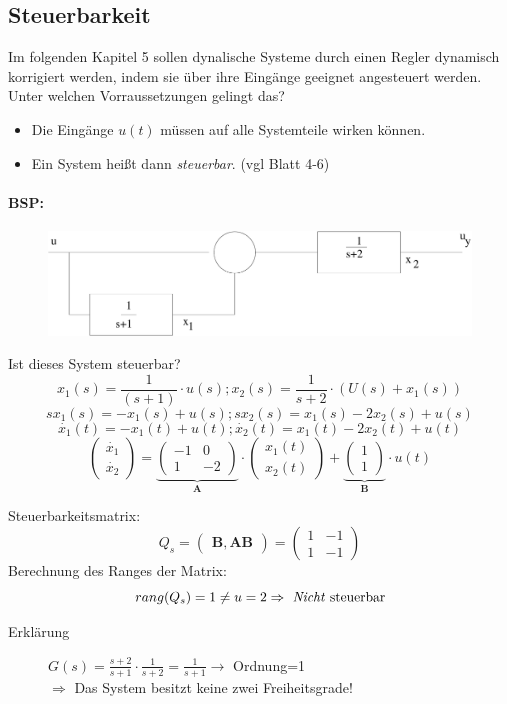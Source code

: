 \documentclass[12pt,a4paper,ngerman]{scrartcl}
\begin{document}
\subsection{Steuerbarkeit}

Im folgenden Kapitel 5 sollen dynalische Systeme durch einen Regler dynamisch korrigiert werden, indem sie über ihre Eingänge geeignet angesteuert werden.\\
Unter welchen Vorraussetzungen gelingt das?
\begin{itemize}
\item Die Eingänge $u(t)$ müssen auf alle Systemteile wirken können.
\item Ein System heißt dann \emph{steuerbar}. (vgl Blatt 4-6)
\end{itemize}

\paragraph{BSP:}

\begin{figure}[H]
  \centering
  \includegraphics[width=.7\linewidth]{sysregel_bsp_kap4}
\end{figure}
Ist dieses System steuerbar?
\[
x_1(s)=\frac{1}{(s+1)}\cdot u(s);x_2(s)=\frac{1}{s+2}\cdot (U(s)+x_1(s))
\]
\[
sx_1(s)=-x_1(s)+u(s);sx_2(s)=x_1(s)-2x_2(s)+u(s)
\]
\[
\dot{x_1}(t)=-x_1(t)+u(t);\dot{x_2}(t)=x_1(t)-2x_2(t)+u(t)
\]
\[
\begin{pmatrix}
\dot{x_1}\\
\dot{x_2}
\end{pmatrix}
=
\underbrace{\begin{pmatrix}
 -1&0\\
 1&-2 
\end{pmatrix}}_{\mathbf{A}}
\cdot
\begin{pmatrix}
  x_1(t)\\
  x_2(t)
\end{pmatrix}
+
\underbrace{\begin{pmatrix}
  1\\
1
\end{pmatrix}}_{\mathbf{B}}
\cdot u(t)
\]

Steuerbarkeitsmatrix:
\[
Q_s=
\begin{pmatrix}
  \mathbf{B},\mathbf{A}\mathbf{B}
\end{pmatrix}
=
\begin{pmatrix}
  1&-1\\
1&-1
\end{pmatrix}
\]
Berechnung des Ranges der Matrix:
\[
rang(Q_s)=1 \neq u=2\Rightarrow \text{ \emph{Nicht} steuerbar}
\]
\begin{description}
\item[Erklärung] $G(s)=\frac{s+2}{s+1}\cdot\frac{1}{s+2}=\frac{1}{s+1}\rightarrow $ Ordnung=1\\
$\Rightarrow$ Das System besitzt keine zwei Freiheitsgrade!
\end{description}
\end{document}
